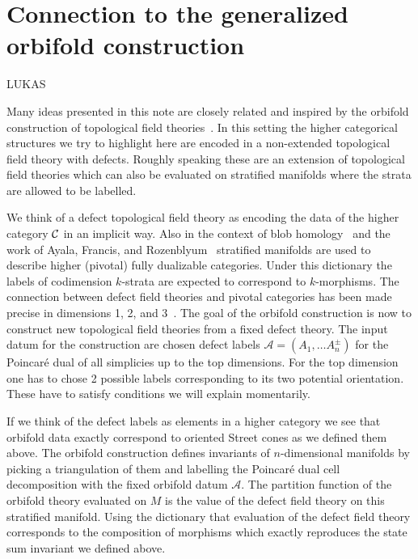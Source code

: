 
\section{Connection to the generalized orbifold construction}

LUKAS

Many ideas presented in this note are closely related and inspired by the orbifold construction of topological field theories~\cite{carqueville2019orbifolds}. In this setting the higher categorical structures we try to highlight here are encoded in a non-extended topological field theory with defects. Roughly speaking these are an extension of topological field theories which can also be evaluated on stratified manifolds where the strata are allowed to be labelled.

We think of a defect topological field theory as encoding the data of the higher category $\mathcal{C}$ in an implicit way. Also in the context of blob homology~\cite{blob} and the work of Ayala, Francis, and Rozenblyum~\cite{Ayala2015ASH} stratified manifolds are used to describe higher (pivotal) fully dualizable categories.
Under this dictionary the labels of codimension $k$-strata are expected to correspond to $k$-morphisms.
The connection between defect field theories and pivotal categories has been made precise in dimensions 1, 2, and 3~\cite{Davydov:2011kb, CARQUEVILLE2020107024}.
The goal of the orbifold construction is now to construct new topological field theories from a fixed defect theory.
The input datum for the construction are chosen defect labels $\mathcal{A}=(A_1,\dots A_n^{\pm})$ for the Poincaré dual of all simplicies up to the top dimensions.
For the top dimension one has to chose 2 possible labels corresponding to its two potential orientation.
These have to satisfy conditions we will explain momentarily. 

If we think of the defect labels as elements in a higher category we see that orbifold data exactly correspond to oriented Street cones as we defined them above.
The orbifold construction defines invariants of $n$-dimensional manifolds by picking a triangulation of them and labelling the Poincaré dual cell decomposition with the fixed orbifold datum $\mathcal{A}$.
The partition function of the orbifold theory evaluated on $M$ is the value of the defect field theory on this stratified manifold.
Using the dictionary that evaluation of the defect field theory corresponds to the composition of morphisms which exactly reproduces the state sum invariant we defined above.

